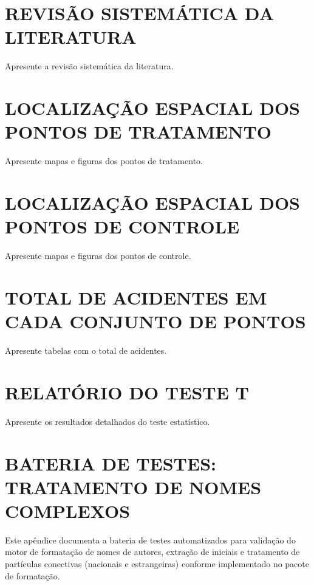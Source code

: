 \appendix

\chapter{REVISÃO SISTEMÁTICA DA LITERATURA}
\label{apendice:rsl}

Apresente a revisão sistemática da literatura.

\chapter{LOCALIZAÇÃO ESPACIAL DOS PONTOS DE TRATAMENTO}
\label{apendice:localizacao_tratamento}

Apresente mapas e figuras dos pontos de tratamento.

\chapter{LOCALIZAÇÃO ESPACIAL DOS PONTOS DE CONTROLE}
\label{apendice:localizacao_controle}

Apresente mapas e figuras dos pontos de controle.

\chapter{TOTAL DE ACIDENTES EM CADA CONJUNTO DE PONTOS}
\label{apendice:total_acidentes}

Apresente tabelas com o total de acidentes.

\chapter{RELATÓRIO DO TESTE T}
\label{apendice:teste_t}

Apresente os resultados detalhados do teste estatístico.

\chapter{BATERIA DE TESTES: TRATAMENTO DE NOMES COMPLEXOS}
\label{apendice:teste_nomes}

Este apêndice documenta a bateria de testes automatizados para validação do motor de formatação de nomes de autores, extração de iniciais e tratamento de partículas conectivas (nacionais e estrangeiras) conforme implementado no pacote de formatação.

\begingroup
\newcommand{\testanome}[2]{%
  \begingroup
    \ultimosobrenomeautor{#1}%
    \prenomesautor{#2}%
    \noindent\textbf{Entrada:} \texttt{\textbackslash prenomesautor\{#2\}} e \texttt{\textbackslash ultimosobrenomeautor\{#1\}} \\
    \textbf{Cessão de Direitos (Completo):} \nomecompletoautor \\
    \textbf{Ficha Catalográfica:} \autorreferenciacatalografica \\
    \textbf{Referência da Dissertação:} \autorreferenciabibliografica \par
    \vspace{0.15cm}\hrule\vspace{0.3cm}
  \endgroup
}

